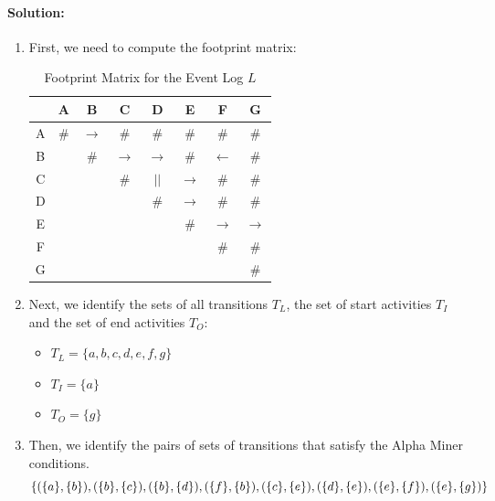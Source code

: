 \paragraph{Solution:}
\begin{enumerate}
    \item First, we need to compute the footprint matrix:
    \begin{table}[H]
    \centering
    \begin{tabular}{c|ccccccc}
        & A & B & C & D & E & F & G \\
        \hline
        A & $\#$ & $\rightarrow$ & $\#$ & $\#$ & $\#$ & $\#$ & $\#$ \\
        B &  & $\#$ & $\rightarrow$ & $\rightarrow$ & $\#$ & $\leftarrow$ & $\#$ \\
        C &  &  & $\#$ & $||$ & $\rightarrow$ & $\#$ & $\#$ \\
        D &  &  &  & $\#$ & $\rightarrow$ & $\#$ & $\#$ \\
        E &  &  &  &  & $\#$ & $\rightarrow$ & $\rightarrow$ \\
        F &  &  &  &  &  & $\#$ & $\#$ \\
        G &  &  &  &  &  &  & $\#$ \\
    \end{tabular}
    \caption{Footprint Matrix for the Event Log \(L\)}
\end{table}
    \item Next, we identify the sets of all transitions $T_L$, the set of start activities $T_I$ and the set of end activities $T_O$:
    \begin{itemize}
        \item $T_L = \{a,b,c,d,e,f,g\}$
        \item $T_I = \{a\}$
        \item $T_O = \{g\}$
    \end{itemize}
    \item Then, we identify the pairs of sets of transitions that satisfy the Alpha Miner conditions.
    \[
    \{
        (\{a\}, \{b\}),\\
        (\{b\}, \{c\}),\\
        (\{b\}, \{d\}),\\
        (\{f\}, \{b\}),\\
        (\{c\}, \{e\}),\\
        (\{d\}, \{e\}),\\
        (\{e\}, \{f\}),\\
        (\{e\}, \{g\})
    \}
\]
\end{enumerate}
